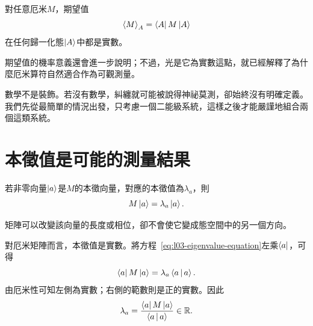 \begin{proposition}
對任意厄米\(M\)，期望值
\begin{equation}
  \left\langle M\right\rangle_A=\left\langle A\right\rvert M\left\lvert A\right\rangle
  \label{eq:l03-expectation}
\end{equation}
在任何歸一化態\(\left\lvert A\right\rangle\)中都是實數。
\end{proposition}

期望值的機率意義還會進一步說明；不過，光是它為實數這點，就已經解釋了為什麼厄米算符自然適合作為可觀測量。

\begin{classroomqa}
\end{classroomqa}

\begin{classroomqa}
\end{classroomqa}

數學不是裝飾。若沒有數學，糾纏就可能被說得神祕莫測，卻始終沒有明確定義。我們先從最簡單的情況出發，只考慮一個二能級系統，這樣之後才能嚴謹地組合兩個這類系統。

\section{本徵值是可能的測量結果}

\begin{definition}
若非零向量\(\left\lvert a\right\rangle\)是\(M\)的本徵向量，對應的本徵值為\(\lambda_a\)，則
\begin{equation}
  M\left\lvert a\right\rangle=\lambda_a\left\lvert a\right\rangle.
  \label{eq:l03-eigenvalue-equation}
\end{equation}
\end{definition}
矩陣可以改變該向量的長度或相位，卻不會使它變成態空間中的另一個方向。

對厄米矩陣而言，本徵值是實數。將方程~\eqref{eq:l03-eigenvalue-equation}左乘\(\left\langle a\right\rvert\)，可得
\begin{equation}
  \left\langle a\right\rvert M\left\lvert a\right\rangle
  =\lambda_a\left\langle a\,\middle|\,a\right\rangle.
\end{equation}
由厄米性可知左側為實數；右側的範數則是正的實數。因此
\begin{equation}
  \lambda_a
  =
  \frac{\left\langle a\right\rvert M\left\lvert a\right\rangle}{\left\langle a\,\middle|\,a\right\rangle}
  \in\mathbb R.
  \label{eq:l03-real-eigenvalue}
\end{equation}

